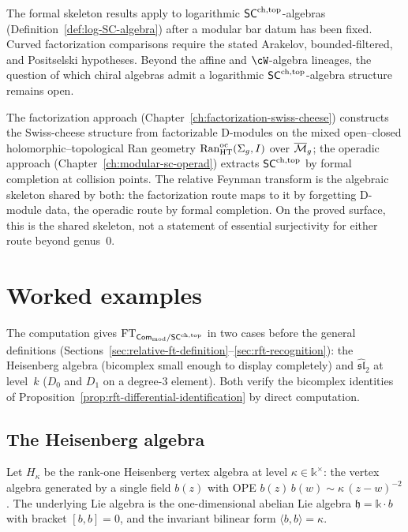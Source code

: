 The formal skeleton results apply to logarithmic $\mathsf{SC}^{\mathrm{ch,top}}$-algebras
(Definition~\ref{def:log-SC-algebra}) after a modular bar datum has
been fixed. Curved factorization comparisons require the stated
Arakelov, bounded-filtered, and Positselski hypotheses. Beyond the
affine and $\cW$-algebra lineages, the question of which chiral
algebras admit a logarithmic $\mathsf{SC}^{\mathrm{ch,top}}$-algebra structure remains
open.

The factorization approach (Chapter~\ref{ch:factorization-swiss-cheese}) constructs the Swiss-cheese structure from factorizable D-modules on the mixed open--closed holomorphic--topological Ran geometry $\operatorname{Ran}^{\mathrm{oc}}_{\mathrm{HT}}(\Sigma_g,I)$ over $\overline{\mathcal{M}}_g$; the operadic approach (Chapter~\ref{ch:modular-sc-operad}) extracts $\mathsf{SC}^{\mathrm{ch,top}}$ by formal completion at collision points. The relative Feynman transform is the algebraic skeleton shared by both: the factorization route maps to it by forgetting D-module data, the operadic route by formal completion. On the proved surface, this is the shared skeleton, not a statement of essential surjectivity for either route beyond genus~$0$.

\section{Worked examples}
\label{sec:rft-worked-examples}

The computation gives $\mathrm{FT}_{\mathsf{Com}_{\mathrm{mod}} / \mathsf{SC}^{\mathrm{ch,top}}}$ in two cases before the general definitions (Sections~\ref{sec:relative-ft-definition}--\ref{sec:rft-recognition}): the Heisenberg algebra (bicomplex small enough to display completely) and $\widehat{\mathfrak{sl}}_2$ at level~$k$ ($D_0$ and $D_1$ on a degree-$3$ element). Both verify the bicomplex identities of Proposition~\ref{prop:rft-differential-identification} by direct computation.

\subsection{The Heisenberg algebra}
\label{subsec:rft-heisenberg}

Let $H_\kappa$ be the rank-one Heisenberg vertex algebra at
level $\kappa \in \mathbb{k}^\times$: the vertex algebra
generated by a single field $b(z)$ with OPE
$b(z)\, b(w) \sim \kappa\, (z-w)^{-2}$. The underlying Lie
algebra is the one-dimensional abelian Lie algebra
$\mathfrak{h} = \mathbb{k}\cdot b$ with bracket $[b,b] = 0$,
and the invariant bilinear form
$\langle b, b \rangle = \kappa$.

